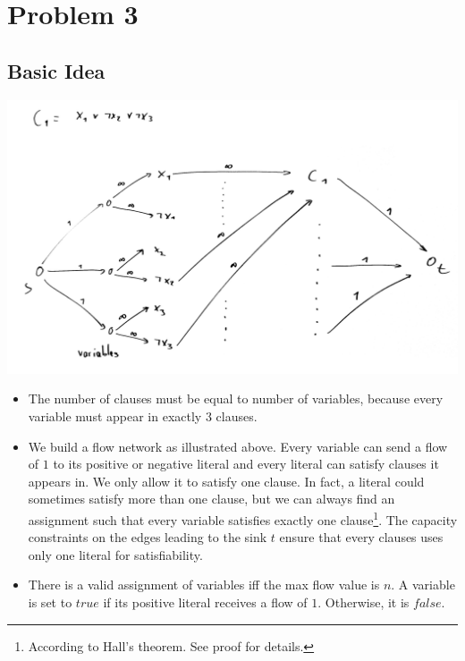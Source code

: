 \documentclass[12pt]{article}
\begin{document}
\section*{Problem 3}
\subsection*{Basic Idea}
\includegraphics[width=\textwidth]{3_1.pdf}
\begin{itemize}
	\item The number of clauses must be equal to number of variables, because every variable must appear in exactly 3 clauses.
	\item We build a flow network as illustrated above. Every variable can send a flow of $1$ to its positive or negative literal and every literal can satisfy clauses it appears in. We only allow it to satisfy one clause. In fact, a literal could sometimes satisfy more than one clause, but we can always find an assignment such that every variable satisfies exactly one clause\footnote{According to Hall's theorem. See proof for details.}. The capacity constraints on the edges leading to the sink $t$ ensure that every clauses uses only one literal for satisfiability.
	\item There is a valid assignment of variables iff the max flow value is $n$. A variable is set to $\mathit{true}$ if its positive literal receives a flow of $1$. Otherwise, it is $\mathit{false}$.
\end{itemize}
\end{document}
